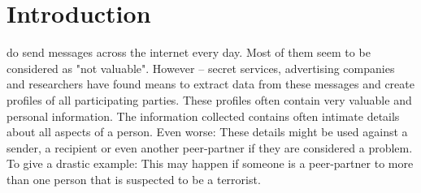 \documentclass[12pt,journal,compsoc]{IEEEtran}
\begin{document}
\section{Introduction}
%
%



% 
% 
% 
% 
 do send messages across the internet every day. Most of them seem to be considered as "not valuable". However -- secret services, advertising companies and researchers have found means to extract data from these messages and create profiles of all participating parties. These profiles often contain very valuable and personal information. The information collected contains often intimate details about all aspects of a person. Even worse: These details might be used against a sender, a recipient or even another peer-partner if they are considered a problem. To give a drastic example: This may happen if someone is a peer-partner to more than one person that is suspected to be a terrorist.\par
\end{document}

